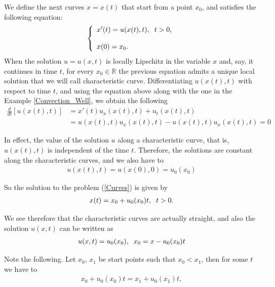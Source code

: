		We define the next curves $x = x(t)$ that start from a point $x_0$, and satisfies the following equation:
		\begin{align}
			\label{Curves}	
			\left \lbrace \begin{array}{ll}
				x' (t) = u(x(t), t), \hspace{2mm} t > 0, \\
				\\
				x(0) = x_0.
			\end{array} \right .  
		\end{align}
		When the solution $u = u(x, t)$ is locally Lipschitz in the variable $x$ and, say, it continues in time $t$, for every $x_0 \in \mathbb{R}$ the previous equation admits a unique local solution that we will call characteristic curve. Differentiating $u(x(t), t)$ with respect to time $t$, and using the equation above along with the one in the Example \ref{Convection_Well}, we obtain the following
		\begin{align*}
			\frac{d}{dt} [u(x(t), t)] &= x' (t) u_x (x(t), t) + u_t (x(t), t) \\
			&= u(x(t), t) u_x (x(t), t) - u(x(t), t) u_x (x(t), t) = 0
		\end{align*}
		
		In effect, the value of the solution $u$ along a characteristic curve, that is, $u(x(t), t)$ is independent of the time $t$. Therefore, the solutions are constant along the characteristic curves, and we also have to
		\begin{align*}
			u(x(t), t) = u (x(0), 0) = u_0 (x_0)
		\end{align*}
		
		So the solution to the problem (\ref{Curves}) is given by
		\begin{align*}
			x(t) = x_0 + u_0 (x_0) t, \hspace{2mm} t > 0.
		\end{align*}
		
		We see therefore that the characteristic curves are actually straight, and also the solution $u(x, t)$ can be written as
		\begin{align*}
			u(x, t) = u_0(x_0), \hspace{2mm} x_0 = x - u_0(x_0) t
		\end{align*}
		
		Note the following. Let $x_0$, $x_1$ be start points such that $x_0 < x_1$, then for some $t$ we have to
		\begin{align*}
			x_0 + u_0(x_0) t = x_1 + u_0 (x_1) t,
		\end{align*}
		
